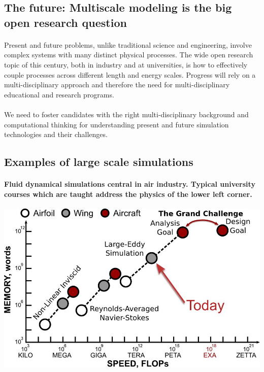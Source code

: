 \documentclass[%
oneside,                 %
final,                   %
10pt]{article}
\begin{document}
\subsection{The future: Multiscale modeling is the big open research question}


\paragraph{}
Present and future problems, unlike traditional
science and engineering, involve complex systems with many distinct
physical processes. The wide open research topic of this century, both
in industry and at universities, is how to effectively couple
processes across different length and energy scales. Progress will
rely on a multi-disciplinary approach and therefore the  need for
multi-disciplinary educational and research programs.




\paragraph{}
We need to foster candidates with the right
multi-disciplinary background and computational thinking for
understanding present and future simulation technologies and their challenges.




\subsection{Examples of large scale simulations}

\paragraph{Fluid dynamical simulations central in air industry.  Typical university courses which are taught address the physics of the lower left corner.}


\centerline{\includegraphics[width=0.6\linewidth]{fig-future/fig10.jpg}}
\end{document}
